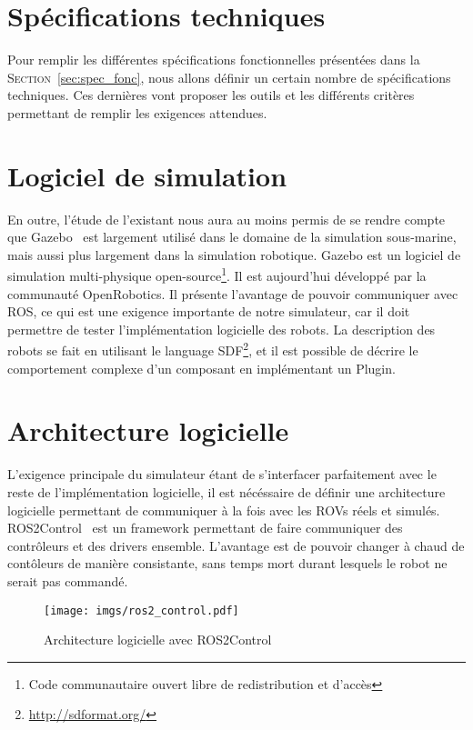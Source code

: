     \section{Spécifications techniques}

        Pour remplir les différentes spécifications fonctionnelles présentées dans la \textsc{Section}~\ref{sec:spec_fonc}, nous allons définir un certain nombre de spécifications techniques. Ces dernières vont proposer les outils et les différents critères permettant de remplir les exigences attendues.

    \section{Logiciel de simulation}

        En outre, l'étude de l'existant nous aura au moins permis de se rendre compte que \gls{Gazebo}~\cite{Koenig-gazebo} est largement utilisé dans le domaine de la simulation sous-marine, mais aussi plus largement dans la simulation robotique. \gls{Gazebo} est un logiciel de simulation multi-physique open-source\footnote{Code communautaire ouvert libre de redistribution et d'accès}. Il est aujourd'hui développé par la communauté \gls{OpenRobotics}. Il présente l'avantage de pouvoir communiquer avec \gls{ROS}, ce qui est une exigence importante de notre simulateur, car il doit permettre de tester l'implémentation logicielle des robots. La description des robots se fait en utilisant le language \gls{SDF}\footnote{\url{http://sdformat.org/}}, et il est possible de décrire le comportement complexe d'un composant en implémentant un \gls{Plugin}.

    \section{Architecture logicielle}

        L'exigence principale du simulateur étant de s'interfacer parfaitement avec le reste de l'implémentation logicielle, il est nécéssaire de définir une architecture logicielle permettant de communiquer à la fois avec les \gls{ROV}s réels et simulés. \gls{ROS2Control}~\cite{ros_control} est un framework permettant de faire communiquer des contrôleurs et des drivers ensemble. L'avantage est de pouvoir changer à chaud de contôleurs de manière consistante, sans temps mort durant lesquels le robot ne serait pas commandé.

        \begin{figure}[!htb]
            \centering
            \texttt{[image: imgs/ros2\_control.pdf]}
            \caption{Architecture logicielle avec \gls{ROS2Control}}
            \label{fig:ros2_control}
        \end{figure}

